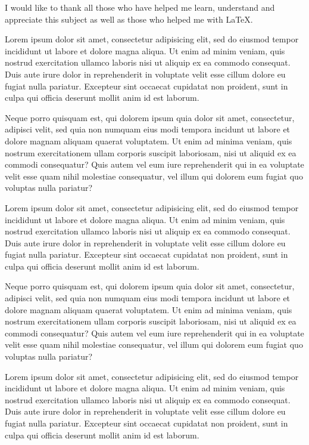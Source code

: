%

I would like to thank all those who have helped me learn, understand and 
appreciate this subject as well as those who helped me with \LaTeX.

Lorem ipsum dolor sit amet, consectetur adipisicing elit, sed do eiusmod
tempor incididunt ut labore et dolore magna aliqua. Ut enim ad minim veniam,
quis nostrud exercitation ullamco laboris nisi ut aliquip ex ea commodo
consequat. Duis aute irure dolor in reprehenderit in voluptate velit esse
cillum dolore eu fugiat nulla pariatur. Excepteur sint occaecat cupidatat
non proident, sunt in culpa qui officia deserunt mollit anim id est laborum.

Neque porro quisquam est, qui dolorem ipsum quia dolor sit amet, consectetur, 
adipisci velit, sed quia non numquam eius modi tempora incidunt ut labore et 
dolore magnam aliquam quaerat voluptatem. Ut enim ad minima veniam, quis 
nostrum exercitationem ullam corporis suscipit laboriosam, nisi ut aliquid 
ex ea commodi consequatur? Quis autem vel eum iure reprehenderit qui in ea 
voluptate velit esse quam nihil molestiae consequatur, vel illum qui dolorem 
eum fugiat quo voluptas nulla pariatur?

Lorem ipsum dolor sit amet, consectetur adipisicing elit, sed do eiusmod
tempor incididunt ut labore et dolore magna aliqua. Ut enim ad minim veniam,
quis nostrud exercitation ullamco laboris nisi ut aliquip ex ea commodo
consequat. Duis aute irure dolor in reprehenderit in voluptate velit esse
cillum dolore eu fugiat nulla pariatur. Excepteur sint occaecat cupidatat
non proident, sunt in culpa qui officia deserunt mollit anim id est laborum.

Neque porro quisquam est, qui dolorem ipsum quia dolor sit amet, consectetur, 
adipisci velit, sed quia non numquam eius modi tempora incidunt ut labore et 
dolore magnam aliquam quaerat voluptatem. Ut enim ad minima veniam, quis 
nostrum exercitationem ullam corporis suscipit laboriosam, nisi ut aliquid 
ex ea commodi consequatur? Quis autem vel eum iure reprehenderit qui in ea 
voluptate velit esse quam nihil molestiae consequatur, vel illum qui dolorem 
eum fugiat quo voluptas nulla pariatur?

Lorem ipsum dolor sit amet, consectetur adipisicing elit, sed do eiusmod
tempor incididunt ut labore et dolore magna aliqua. Ut enim ad minim veniam,
quis nostrud exercitation ullamco laboris nisi ut aliquip ex ea commodo
consequat. Duis aute irure dolor in reprehenderit in voluptate velit esse
cillum dolore eu fugiat nulla pariatur. Excepteur sint occaecat cupidatat
non proident, sunt in culpa qui officia deserunt mollit anim id est laborum.


